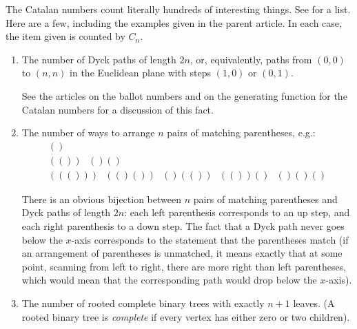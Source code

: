 \documentclass[12pt]{article}
\begin{document}
The Catalan numbers count literally hundreds of interesting things. See  for a list. Here are a few, including the examples given in the parent article. In each case, the item given is counted by $C_n$.

\begin{enumerate}

\item The number of Dyck paths of length $2n$, or, equivalently, paths from $(0,0)$ to $(n,n)$ in the Euclidean plane with steps $(1,0)$ or $(0,1)$.

See the articles on the ballot numbers and on the generating function for the Catalan numbers for a discussion of this fact.

\item The number of ways to arrange $n$ pairs of matching parentheses, e.g.:
\begin{gather*}
()\\
(())\text{ } ()()\\
((()))\text{ } (()())\text{ } ()(())\text{ } (())()\text{ } ()()()
\end{gather*}

There is an obvious bijection between $n$ pairs of matching parentheses and Dyck paths of length $2n$: each left parenthesis corresponds to an up step, and each right parenthesis to a down step. The fact that a Dyck path never goes below the $x$-axis corresponds to the statement that the parentheses match (if an arrangement of parentheses is unmatched, it means exactly that at some point, scanning from left to right, there are more right than left parentheses, which would mean that the corresponding path would drop below the $x$-axis).

\item The number of rooted complete binary trees with exactly $n+1$ leaves. (A rooted binary tree is \emph{complete} if every vertex has either zero or two children).


\end{enumerate}
\end{document}
